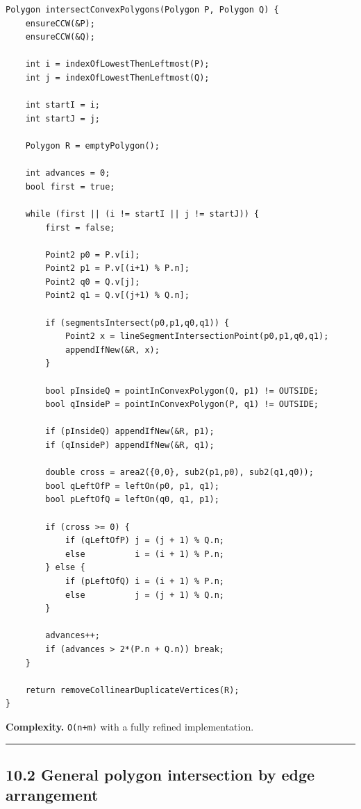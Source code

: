 \documentclass[11pt]{article}
\begin{document}
\begin{verbatim}
Polygon intersectConvexPolygons(Polygon P, Polygon Q) {
    ensureCCW(&P);
    ensureCCW(&Q);

    int i = indexOfLowestThenLeftmost(P);
    int j = indexOfLowestThenLeftmost(Q);

    int startI = i;
    int startJ = j;

    Polygon R = emptyPolygon();

    int advances = 0;
    bool first = true;

    while (first || (i != startI || j != startJ)) {
        first = false;

        Point2 p0 = P.v[i];
        Point2 p1 = P.v[(i+1) % P.n];
        Point2 q0 = Q.v[j];
        Point2 q1 = Q.v[(j+1) % Q.n];

        if (segmentsIntersect(p0,p1,q0,q1)) {
            Point2 x = lineSegmentIntersectionPoint(p0,p1,q0,q1);
            appendIfNew(&R, x);
        }

        bool pInsideQ = pointInConvexPolygon(Q, p1) != OUTSIDE;
        bool qInsideP = pointInConvexPolygon(P, q1) != OUTSIDE;

        if (pInsideQ) appendIfNew(&R, p1);
        if (qInsideP) appendIfNew(&R, q1);

        double cross = area2({0,0}, sub2(p1,p0), sub2(q1,q0));
        bool qLeftOfP = leftOn(p0, p1, q1);
        bool pLeftOfQ = leftOn(q0, q1, p1);

        if (cross >= 0) {
            if (qLeftOfP) j = (j + 1) % Q.n;
            else          i = (i + 1) % P.n;
        } else {
            if (pLeftOfQ) i = (i + 1) % P.n;
            else          j = (j + 1) % Q.n;
        }

        advances++;
        if (advances > 2*(P.n + Q.n)) break;
    }

    return removeCollinearDuplicateVertices(R);
}
\end{verbatim}

\textbf{Complexity.} \texttt{O(n+m)} with a fully
refined implementation.

\begin{center}\rule{0.5\linewidth}{0.5pt}\end{center}

\subsection{10.2 General polygon intersection by edge
arrangement}\label{general-polygon-intersection-by-edge-arrangement}
\end{document}
